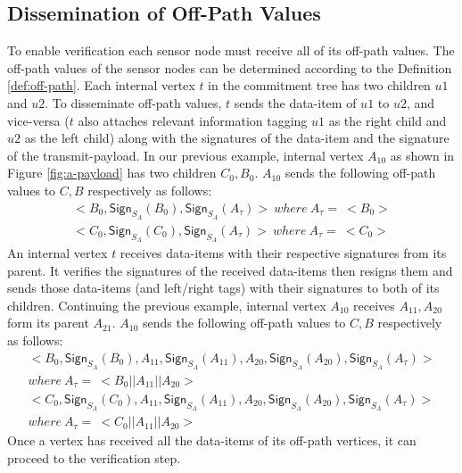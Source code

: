 	\subsection{Dissemination of Off-Path Values}
		To enable verification each sensor node must receive all of its off-path values.
		The off-path values of the sensor nodes can be determined according to the Definition \ref{def:off-path}.
		Each internal vertex $t$ in the commitment tree has two children $u1$ and $u2$. 
		To disseminate off-path values, $t$ sends the data-item of $u1$ to $u2$, and vice-versa ($t$ also attaches relevant information tagging $u1$ as the right child and $u2$ as the left child) along with the signatures of the data-item and the signature of the transmit-payload.
		In our previous example, internal vertex $A_{10}$ as shown in Figure \ref{fig:a-payload} has two children $C_{0},B_{0}$.
		$A_{10}$ sends the following off-path values to $C, B$ respectively as follows:
		\begin{equation}
			\begin{array}{l}
			<B_{0}, \textsf{Sign}_{S_{A}}(B_{0}),\textsf{Sign}_{S_{A}}(A_{\tau})>\ where\ A_{\tau} =\ <B_{0}>\\
			<C_{0}, \textsf{Sign}_{S_{A}}(C_{0}),\textsf{Sign}_{S_{A}}(A_{\tau})>\ where\ A_{\tau} =\ <C_{0}>
			\end{array}
		\end{equation}
		An internal vertex $t$ receives data-items with their respective signatures from its parent. 
		It verifies the signatures of the received data-items then resigns them and sends those data-items (and left/right tags) with their signatures to both of its children.
		Continuing the previous example, internal vertex $A_{10}$ receives $A_{11}, A_{20}$ form its parent $A_{21}$.
		$A_{10}$ sends the following off-path values to $C, B$ respectively as follows:
		\begin{equation}
			\begin{array}{l}
			<B_{0}, \textsf{Sign}_{S_{A}}(B_{0}),A_{11},\textsf{Sign}_{S_{A}}(A_{11}),A_{20},\textsf{Sign}_{S_{A}}(A_{20}),\textsf{Sign}_{S_{A}}(A_{\tau})>\\ 
				where\  A_{\tau} =\ <B_{0}||A_{11}||A_{20}>\\
			<C_{0}, \textsf{Sign}_{S_{A}}(C_{0}),A_{11},\textsf{Sign}_{S_{A}}(A_{11}),A_{20},\textsf{Sign}_{S_{A}}(A_{20}),\textsf{Sign}_{S_{A}}(A_{\tau})>\\ 
				where\  A_{\tau} =\ <C_{0}||A_{11}||A_{20}>
			\end{array}
		\end{equation}
		Once a vertex has received all the data-items of its off-path vertices, it can proceed to the verification step.
	
